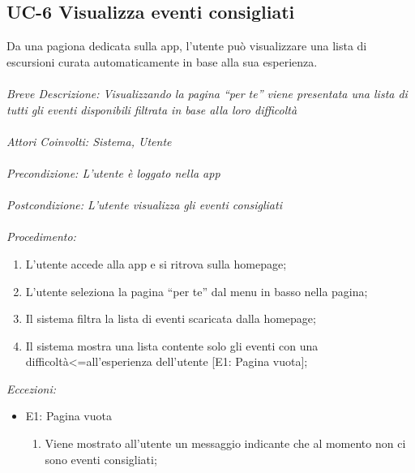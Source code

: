 \subsection{UC-6 Visualizza eventi consigliati}
Da una pagiona dedicata sulla app, l'utente può visualizzare una lista di escursioni curata automaticamente in base alla sua esperienza.
\\
\\
\textit{Breve Descrizione: Visualizzando la pagina ``per te'' viene presentata una lista di tutti gli eventi disponibili filtrata in base alla loro difficoltà} 
\\
\\
\textit{Attori Coinvolti: Sistema, Utente}
\\
\\
\textit{Precondizione: L'utente è loggato nella app}
\\
\\
\textit{Postcondizione: L'utente visualizza gli eventi consigliati}
\\
\\
\textit{Procedimento:}
\begin{enumerate}
	\item L'utente accede alla app e si ritrova sulla homepage;
	\item L'utente seleziona la pagina ``per te'' dal menu in basso nella pagina;
	\item Il sistema filtra la lista di eventi scaricata dalla homepage;
	\item Il sistema mostra una lista contente solo gli eventi con una difficoltà<=all'esperienza dell'utente [E1: Pagina vuota];
\end{enumerate}


\textit{Eccezioni:}
\begin{itemize}
	\item E1: Pagina vuota
	\begin{enumerate}
		\item Viene mostrato all'utente un messaggio indicante che al momento non ci sono eventi consigliati;
	\end{enumerate}
\end{itemize}